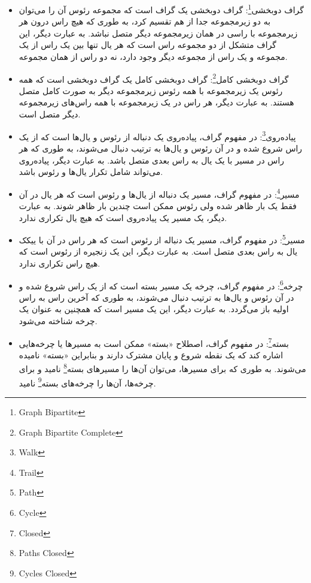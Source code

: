 \documentclass[a4paper,10pt]{article}
\begin{document}
\begin{itemize}
        \item گراف دوبخشی\footnote{\hspace{2pt}Graph Bipartite}: گراف دوبخشی یک گراف است که مجموعه رئوس آن را می‌توان به دو زیرمجموعه جدا از هم تقسیم کرد، به طوری که هیچ راس درون هر زیرمجموعه با راسی در همان زیرمجموعه دیگر متصل نباشد. به عبارت دیگر، این گراف متشکل از دو مجموعه راس است که هر یال تنها بین یک راس از یک مجموعه و یک راس از مجموعه دیگر وجود دارد، نه دو راس از همان مجموعه.

        \item گراف دوبخشی کامل\footnote{\hspace{2pt}Graph Bipartite Complete}: گراف دوبخشی کامل یک گراف دوبخشی است که همه رئوس یک زیرمجموعه با همه رئوس زیرمجموعه دیگر به صورت کامل متصل هستند. به عبارت دیگر، هر راس در یک زیرمجموعه با همه راس‌های زیرمجموعه دیگر متصل است.
        
        \item پیاده‌روی\footnote{\hspace{2pt}Walk}: در مفهوم گراف، پیاده‌روی یک دنباله از رئوس و یال‌ها است که از یک راس شروع شده و در آن رئوس و یال‌ها به ترتیب دنبال می‌شوند، به طوری که هر راس در مسیر با یک یال به راس بعدی متصل باشد. به عبارت دیگر، پیاده‌روی می‌تواند شامل تکرار یال‌ها و رئوس باشد.
        
        \item مسیر\footnote{\hspace{2pt}Trail}: در مفهوم گراف، مسیر یک دنباله از یال‌ها و رئوس است که هر یال در آن فقط یک بار ظاهر شده ولی رئوس ممکن است چندین بار ظاهر شوند. به عبارت دیگر، یک مسیر یک پیاده‌روی است که هیچ یال تکراری ندارد.

        \item مسیر\footnote{\hspace{2pt}Path}: در مفهوم گراف، مسیر یک دنباله از رئوس است که هر راس در آن با ییکک یال به راس بعدی متصل است. به عبارت دیگر، این یک زنجیره از رئوس است که هیچ راس تکراری ندارد.
        
        \item چرخه\footnote{\hspace{2pt}Cycle}: در مفهوم گراف، چرخه یک مسیر بسته است که از یک راس شروع شده و در آن رئوس و یال‌ها به ترتیب دنبال می‌شوند، به طوری که آخرین راس به راس اولیه باز می‌گردد. به عبارت دیگر، این یک مسیر است که همچنین به عنوان یک چرخه شناخته می‌شود.

        \item بسته\footnote{\hspace{2pt}Closed}: در مفهوم گراف، اصطلاح «بسته» ممکن است به مسیرها یا چرخه‌هایی اشاره کند که یک نقطه شروع و پایان مشترک دارند و بنابراین «بسته» نامیده می‌شوند. به طوری که برای مسیرها، می‌توان آن‌ها را مسیرهای بسته\footnote{\hspace{2pt}Paths Closed} نامید و برای چرخه‌ها، آن‌ها را چرخه‌های بسته\footnote{\hspace{2pt}Cycles Closed} نامید.
        

\end{itemize}
\end{document}
